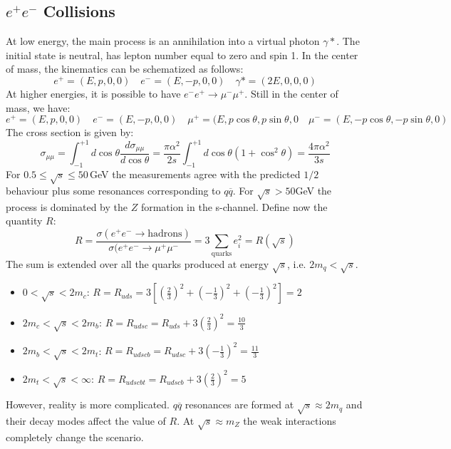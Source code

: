 \documentclass[10.75pt,a4paper,openright,bottom=2cm]{article}
\begin{document}
\subsection{$e^+e^-$ Collisions}
At low energy, the main process is an annihilation into a virtual photon $\gamma*$. The initial state is neutral, has lepton number equal to zero and spin 1. In the center of mass, the kinematics can be schematized as follows:
\[
e^+=(E,p,0,0) \quad e^-=(E,-p,0,0) \quad \gamma*=(2E,0,0,0)
\]
At higher energies, it is possible to have $e^-e^+\to\mu^-\mu^+$. Still in the center of mass, we have:
\[
e^+=(E,p,0,0) \quad e^-=(E,-p,0,0) \quad \mu^+=(E,p\cos\theta,p\sin\theta,0 \quad \mu^-=(E,-p\cos\theta,-p\sin\theta,0)
\]
The cross section is given by:
\[
\sigma_{\mu\mu}=\int_{-1}^{+1}d\cos\theta\frac{d\sigma_{\mu\mu}}{d\cos\theta}=\frac{\pi\alpha^2}{2s}\int_{-1}^{+1}d\cos\theta(1+\cos^2\theta)=\frac{4\pi\alpha^2}{3s}
\]
For $0.5\le\sqrt{s}\le50$\,GeV the measurements agree with the predicted $1/2$ behaviour plus some resonances corresponding to $q\overline{q}$. For $\sqrt{s}>50$\;GeV the process is dominated by the $Z$ formation in the s-channel. Define now the quantity $R$:
\[
R=\frac{\sigma(e^+e^-\to\text{hadrons})}{\sigma(e^+e^-\to\mu^+\mu^-}=3\sum_{\text{quarks}}e_i^2=R(\sqrt{s})
\]
The sum is extended over all the quarks produced at energy $\sqrt{s}$, i.e. $2m_q<\sqrt{s}$.
\begin{itemize}
    \item $0<\sqrt{s}<2m_c$: $R=R_{uds}=3\left[\left(\frac{2}{3}\right)^2+\left(-\frac{1}{3}\right)^2+\left(-\frac{1}{3}\right)^2\right]=2$
    \item $2m_c<\sqrt{s}<2m_b$: $R=R_{udsc}=R_{uds}+3\left(\frac{2}{3}\right)^2=\frac{10}{3}$
    \item $2m_b<\sqrt{s}<2m_t$: $R=R_{udscb}=R_{udsc}+3\left(-\frac{1}{3}\right)^2=\frac{11}{3}$
    \item $2m_t<\sqrt{s}<\infty$: $R=R_{udscbt}=R_{udscb}+3\left(\frac{2}{3}\right)^2=5$
\end{itemize}
However, reality is more complicated. $q\overline{q}$ resonances are formed at $\sqrt{s}\approx2m_q$ and their decay modes affect the value of $R$. At $\sqrt{s}\approx m_Z$ the weak interactions completely change the scenario.
\end{document}
